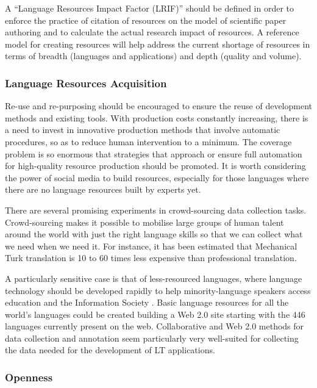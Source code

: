 \documentclass[10pt, plain]{../../metanetpaper}
\begin{document}
\begin{multicols}{2}
A “Language Resources Impact Factor (LRIF)” should be defined in order to enforce the practice of citation of resources on the model of scientific paper authoring and to calculate the actual research impact of resources.  A reference model for creating resources will help address the current shortage of resources in terms of breadth (languages and applications) and depth (quality and volume).

\subsubsection{Language Resources Acquisition}
\label{sec:lang-reso-acqu}

Re-use and re-purposing should be encouraged to ensure the reuse of development methods and existing tools. With production costs constantly increasing, there is a need to invest in innovative production methods that involve automatic procedures, so as to reduce human intervention to a minimum. The coverage problem is so enormous that strategies that approach or ensure full automation for high-quality resource production should be promoted. It is worth considering the power of social media to build resources, especially for those languages where there are no language resources built by experts yet.

There are several promising experiments in crowd-sourcing data collection tasks. Crowd-sourcing makes it possible to mobilise large groups of human talent around the world with just the right language skills so that we can collect what we need when we need it. For instance, it has been estimated that Mechanical Turk translation is 10 to 60 times less expensive than professional translation. 

A particularly sensitive case is that of less-resourced languages, where language technology should be developed rapidly to help minority-language speakers access education and the Information Society \cite{eldia12}. Basic language resources for all the world’s languages could be created building a Web 2.0 site starting with the 446 languages currently present on the web. Collaborative and Web 2.0 methods for data collection and annotation seem particularly very well-suited for collecting the data needed for the development of LT applications.

\subsubsection{Openness}
\label{sec:openness}


\end{multicols}
\end{document}
